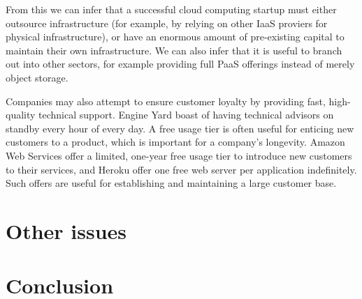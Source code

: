 \documentclass[a4paper]{proc}
\begin{document}
  From this we can infer that a successful cloud computing startup must either outsource infrastructure (for example, by relying on other IaaS proviers for physical infrastructure), or have an enormous amount of pre-existing capital to maintain their own infrastructure. We can also infer that it is useful to branch out into other sectors, for example providing full PaaS offerings instead of merely object storage.

  Companies may also attempt to ensure customer loyalty by providing fast, high-quality technical support. Engine Yard boast of having technical advisors on standby every hour of every day. A free usage tier is often useful for enticing new customers to a product, which is important for a company's longevity. Amazon Web Services offer a limited, one-year free usage tier to introduce new customers to their services, and Heroku offer one free web server per application indefinitely. Such offers are useful for establishing and maintaining a large customer base.

  \section{Other issues}
  \label{sec:other}


  \section{Conclusion}
  \label{sec:conclusion}

  \printbibliography
\end{document}
